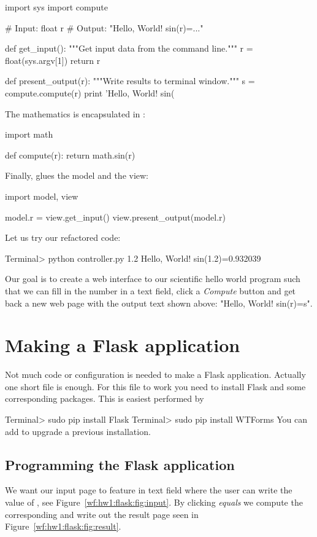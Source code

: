\documentclass[%
oneside,                 %
final,                   %
10pt]{article}
\begin{document}
\bpypro
import sys
import compute

# Input: float r
# Output: "Hello, World! sin(r)=..."

def get_input():
    """Get input data from the command line."""
    r = float(sys.argv[1])
    return r

def present_output(r):
    """Write results to terminal window."""
    s = compute.compute(r)
    print 'Hello, World! sin(%
\epypro

The mathematics is encapsulated in :

\bpypro
import math

def compute(r):
    return math.sin(r)
\epypro

Finally,  glues the model and the view:

\bpypro
import model, view

model.r = view.get_input()
view.present_output(model.r)
\epypro

Let us try our refactored code:

\bsys
Terminal> python controller.py 1.2
Hello, World! sin(1.2)=0.932039
\esys

Our goal is to create a web interface to our scientific hello world
program such that we can fill in the number  in a text field, click a
\emph{Compute} button and get back a new web page with the output text
shown above: "Hello, World! sin(r)=s".

\section{Making a Flask application}


Not much code or configuration is needed to make a Flask application.
Actually one short file is enough. For this file to work you need to
install Flask and some corresponding packages. This is easiest
performed by

\bsys
Terminal> sudo pip install Flask
Terminal> sudo pip install WTForms
\esys
You can add  to upgrade a previous installation.

\subsection{Programming the Flask application}

We want our input page to feature in text field where the user can
write the value of , see Figure~\ref{wf:hw1:flask:fig:input}.
By clicking \emph{equals}
we compute the corresponding  and write out the result page
seen in Figure~\ref{wf:hw1:flask:fig:result}.
\end{document}
